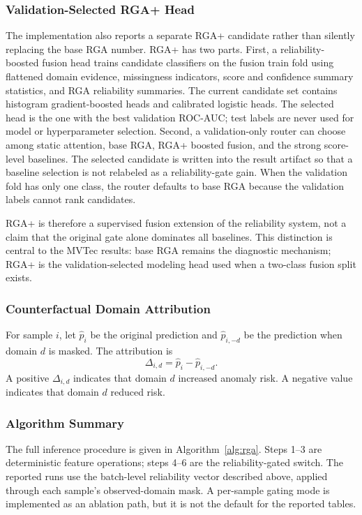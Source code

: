 \documentclass[10pt,conference]{IEEEtran}
\newcommand{\method}{RGA}
\newcommand{\methodplus}{RGA+}
\begin{document}
\subsubsection{Validation-Selected \methodplus{} Head}
The implementation also reports a separate \methodplus{} candidate rather than
silently replacing the base \method{} number. \methodplus{} has two parts. First,
a reliability-boosted fusion head trains candidate classifiers on the fusion
train fold using flattened domain evidence, missingness indicators, score and
confidence summary statistics, and \method{} reliability summaries. The current
candidate set contains histogram gradient-boosted heads and calibrated logistic
heads. The selected head is the one with the best validation ROC-AUC; test
labels are never used for model or hyperparameter selection. Second, a
validation-only router can choose among static attention, base \method{},
\methodplus{} boosted fusion, and the strong score-level baselines. The selected
candidate is written into the result artifact so that a baseline selection is
not relabeled as a reliability-gate gain. When the validation fold has only one
class, the router defaults to base \method{} because the validation labels cannot
rank candidates.

\methodplus{} is therefore a supervised fusion extension of the reliability
system, not a claim that the original gate alone dominates all baselines. This
distinction is central to the MVTec results: base \method{} remains the
diagnostic mechanism; \methodplus{} is the validation-selected modeling head
used when a two-class fusion split exists.

\subsubsection{Counterfactual Domain Attribution}
For sample $i$, let $\hat{p}_i$ be the original prediction and
$\hat{p}_{i,-d}$ be the prediction when domain $d$ is masked. The attribution is
\begin{equation}
  \Delta_{i,d} = \hat{p}_i - \hat{p}_{i,-d}.
\end{equation}
A positive $\Delta_{i,d}$ indicates that domain $d$ increased anomaly risk. A
negative value indicates that domain $d$ reduced risk.

\subsubsection{Algorithm Summary}
The full inference procedure is given in Algorithm~\ref{alg:rga}. Steps 1--3
are deterministic feature operations; steps 4--6 are the reliability-gated
switch. The reported runs use the batch-level reliability vector described
above, applied through each sample's observed-domain mask. A per-sample gating
mode is implemented as an ablation path, but it is not the default for the
reported tables.
\end{document}
